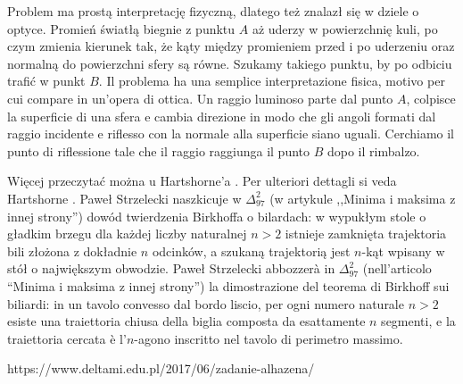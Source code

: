 Problem ma prostą interpretację fizyczną, dlatego też znalazł się w dziele o optyce. %
Promień światłą biegnie z punktu $A$ aż uderzy w powierzchnię kuli, po czym zmienia kierunek tak, że kąty między promieniem przed i po uderzeniu oraz normalną do powierzchni sfery są równe. %
Szukamy takiego punktu, by po odbiciu trafić w punkt $B$. %
Il problema ha una semplice interpretazione fisica, motivo per cui compare in un'opera di ottica. %
Un raggio luminoso parte dal punto $A$, colpisce la superficie di una sfera e cambia direzione in modo che gli angoli formati dal raggio incidente e riflesso con la normale alla superficie siano uguali. %
Cerchiamo il punto di riflessione tale che il raggio raggiunga il punto $B$ dopo il rimbalzo. %

Więcej przeczytać można u Hartshorne'a \cite[s. 278]{hartshorne_2000}. %
Per ulteriori dettagli si veda Hartshorne \cite[p. 278]{hartshorne_2000}. %
Paweł Strzelecki naszkicuje w $\Delta_{97}^2$ (w artykule ,,Minima i maksima z innej strony'') dowód twierdzenia Birkhoffa o bilardach: w wypukłym stole o gładkim brzegu dla każdej liczby naturalnej $n > 2$ istnieje zamknięta trajektoria bili złożona z dokładnie $n$ odcinków, a szukaną trajektorią jest $n$-kąt wpisany w stół o największym obwodzie. %
Paweł Strzelecki abbozzerà in $\Delta_{97}^2$ (nell'articolo ``Minima i maksima z innej strony'') la dimostrazione del teorema di Birkhoff sui biliardi: in un tavolo convesso dal bordo liscio, per ogni numero naturale $n > 2$ esiste una traiettoria chiusa della biglia composta da esattamente $n$ segmenti, e la traiettoria cercata è l'$n$-agono inscritto nel tavolo di perimetro massimo. %

https://www.deltami.edu.pl/2017/06/zadanie-alhazena/

%
